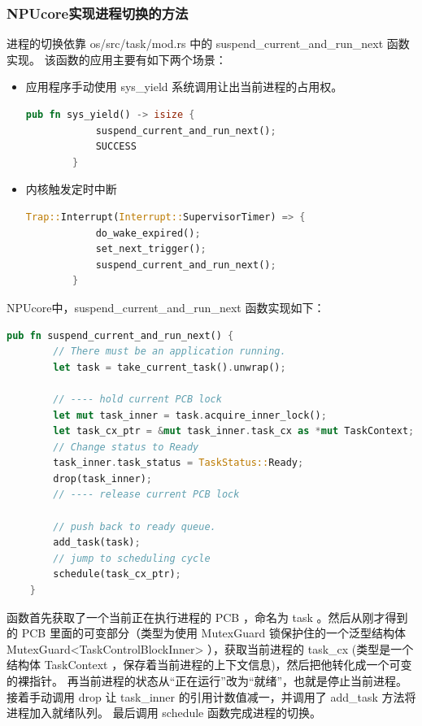 \subsubsection{NPUcore实现进程切换的方法}
进程的切换依靠 os/src/task/mod.rs 中的 suspend\_current\_and\_run\_next 函数实现。
该函数的应用主要有如下两个场景：
\begin{itemize}
	\item{应用程序手动使用 sys\_yield 系统调用让出当前进程的占用权。}
	\begin{lstlisting}[language={Rust}, label={code:syscall yield},caption={syscall yield}]
		pub fn sys_yield() -> isize {
			suspend_current_and_run_next();
			SUCCESS
		}
	\end{lstlisting}
	\item{内核触发定时中断}
	\begin{lstlisting}[language={Rust}, label={code:Timer Interrupt},caption={Timer Interrupt}]
		Trap::Interrupt(Interrupt::SupervisorTimer) => {
			do_wake_expired();
			set_next_trigger();
			suspend_current_and_run_next();
		}
	\end{lstlisting}
\end{itemize}

NPUcore中，suspend\_current\_and\_run\_next 函数实现如下：
\begin{lstlisting}[language={Rust}, label={code:suspend current and run next}, caption={suspend current and run next}]
	pub fn suspend_current_and_run_next() {
		// There must be an application running.
		let task = take_current_task().unwrap();
		
		// ---- hold current PCB lock
		let mut task_inner = task.acquire_inner_lock();
		let task_cx_ptr = &mut task_inner.task_cx as *mut TaskContext;
		// Change status to Ready
		task_inner.task_status = TaskStatus::Ready;
		drop(task_inner);
		// ---- release current PCB lock
		
		// push back to ready queue.
		add_task(task);
		// jump to scheduling cycle
		schedule(task_cx_ptr);
	}
\end{lstlisting}

函数首先获取了一个当前正在执行进程的 PCB ，命名为 task 。然后从刚才得到的 PCB 里面的可变部分（类型为使用 MutexGuard 锁保护住的一个泛型结构体
MutexGuard<TaskControlBlockInner> ），获取当前进程的 task\_cx (类型是一个结构体 TaskContext ，保存着当前进程的上下文信息)，然后把他转化成一个可变的裸指针。
再当前进程的状态从“正在运行”改为“就绪”，也就是停止当前进程。接着手动调用 drop 让 task\_inner 的引用计数值减一，并调用了 add\_task 方法将进程加入就绪队列。
最后调用 schedule 函数完成进程的切换。\\

